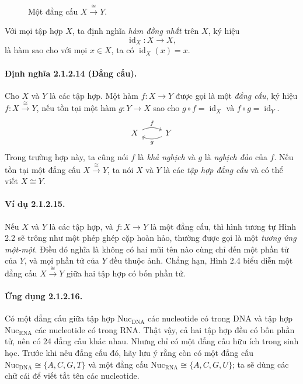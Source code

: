 \begin{figure}[htbp]\centering
{}
\caption{Một đẳng cấu $X\xrightarrow{\cong}Y$.}\label{fig:2-4}
\end{figure}
Với mọi tập hợp $X$, ta định nghĩa \emph{hàm đồng nhất} trên $X$, ký hiệu
\[\operatorname{id}_X:X\to X,\]
là hàm sao cho với mọi $x\in X$, ta có $\operatorname{id}_X(x)=x$.
\paragraph{Định nghĩa 2.1.2.14 (Đẳng cấu).} Cho $X$ và $Y$ là các tập hợp. Một hàm $f:X\to Y$ được gọi là một \emph{đẳng cấu}, ký hiệu $f:X\xrightarrow{\cong}Y$, nếu tồn tại một hàm $g:Y\to X$ sao cho $g\circ f=\operatorname{id}_X$ và $f\circ g=\operatorname{id}_Y$.
\[\begin{tikzcd}X\arrow[r,bend left=25,"f"]&Y\arrow[l,bend left=25,"g"]\end{tikzcd}\]
Trong trường hợp này, ta cũng nói $f$ là \emph{khả nghịch} và $g$ là \emph{nghịch đảo} của $f$. Nếu tồn tại một đẳng cấu $X\xrightarrow{\cong}Y$, ta nói $X$ và $Y$ là các \emph{tập hợp đẳng cấu} và có thể viết $X\cong Y$.
\paragraph{Ví dụ 2.1.2.15.} Nếu $X$ và $Y$ là các tập hợp, và $f:X\to Y$ là một đẳng cấu, thì hình tương tự Hình 2.2 sẽ trông như một phép ghép cặp hoàn hảo, thường được gọi là một \emph{tương ứng một-một}. Điều đó nghĩa là không có hai mũi tên nào cùng chỉ đến một phần tử của $Y$, và mọi phần tử của $Y$ đều thuộc ảnh. Chẳng hạn, Hình 2.4 biểu diễn một đẳng cấu $X\xrightarrow{\cong}Y$ giữa hai tập hợp có bốn phần tử.
\paragraph{Ứng dụng 2.1.2.16.} Có một đẳng cấu giữa tập hợp $\mathrm{Nuc}_{\mathrm{DNA}}$ các nucleotide có trong DNA và tập hợp $\mathrm{Nuc}_{\mathrm{RNA}}$ các nucleotide có trong RNA. Thật vậy, cả hai tập hợp đều có bốn phần tử, nên có 24 đẳng cấu khác nhau. Nhưng chỉ có một đẳng cấu hữu ích trong sinh học. Trước khi nêu đẳng cấu đó, hãy lưu ý rằng còn có một đẳng cấu $\mathrm{Nuc}_{\mathrm{DNA}}\cong\{A,C,G,T\}$ và một đẳng cấu $\mathrm{Nuc}_{\mathrm{RNA}}\cong\{A,C,G,U\}$; ta sẽ dùng các chữ cái để viết tắt tên các nucleotide.

